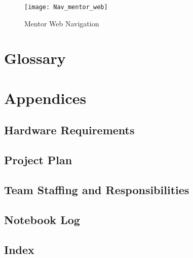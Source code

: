 \documentclass[11pt]{article}
\begin{document}
			\begin{figure}[H]
				\centering
				\texttt{[image: Nav\_mentor\_web]}
				\caption{Mentor Web Navigation}
				\label{NavD}
			\end{figure}

\section{Glossary}

\section{Appendices}

    \subsection{Hardware Requirements}

    \subsection{Project Plan}

    \subsection{Team Staffing and Responsibilities}

    \subsection{Notebook Log}

    \subsection{Index}
    \printindex
    
\end{document}
